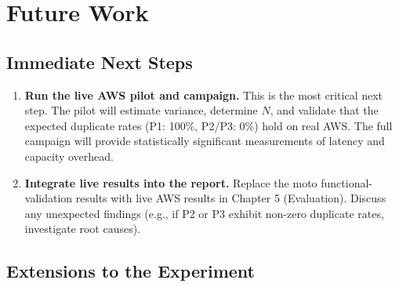 \section{Future Work}

\subsection{Immediate Next Steps}

\begin{enumerate}
    \item \textbf{Run the live AWS pilot and campaign.} This is the most critical next step. The pilot will estimate variance, determine $N$, and validate that the expected duplicate rates (P1: 100\%, P2/P3: 0\%) hold on real AWS. The full campaign will provide statistically significant measurements of latency and capacity overhead.
    
    \item \textbf{Integrate live results into the report.} Replace the moto functional-validation results with live AWS results in Chapter 5 (Evaluation). Discuss any unexpected findings (e.g., if P2 or P3 exhibit non-zero duplicate rates, investigate root causes).
\end{enumerate}

\subsection{Extensions to the Experiment}

